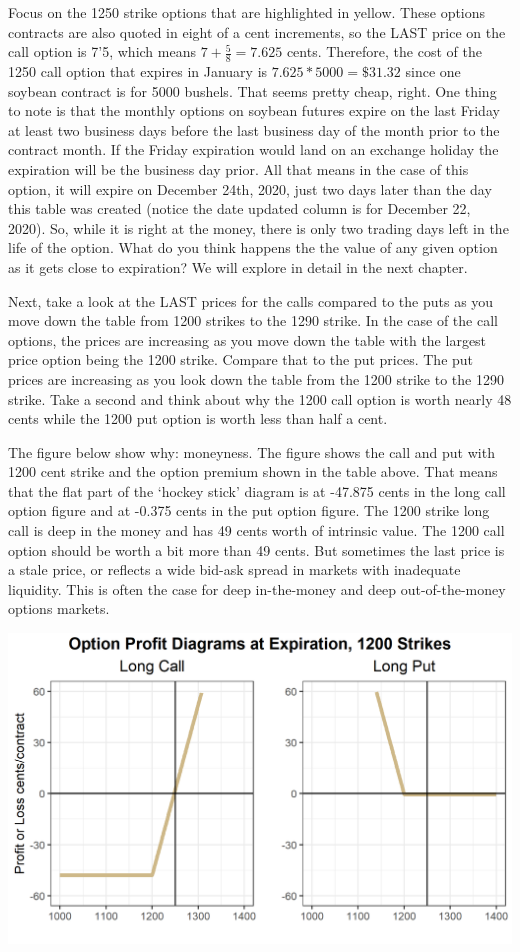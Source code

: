 \documentclass[
  letterpaper,
  DIV=11,
  numbers=noendperiod]{scrreprt}
\begin{document}
Focus on the 1250 strike options that are highlighted in yellow. These
options contracts are also quoted in eight of a cent increments, so the
LAST price on the call option is 7'5, which means
\(7 + \frac{5}{8} = 7.625\) cents. Therefore, the cost of the 1250 call
option that expires in January is \(7.625*5000 = \$31.32\) since one
soybean contract is for 5000 bushels. That seems pretty cheap, right.
One thing to note is that the monthly options on soybean futures expire
on the last Friday at least two business days before the last business
day of the month prior to the contract month. If the Friday expiration
would land on an exchange holiday the expiration will be the business
day prior. All that means in the case of this option, it will expire on
December 24th, 2020, just two days later than the day this table was
created (notice the date updated column is for December 22, 2020). So,
while it is right at the money, there is only two trading days left in
the life of the option. What do you think happens the the value of any
given option as it gets close to expiration? We will explore in detail
in the next chapter.

Next, take a look at the LAST prices for the calls compared to the puts
as you move down the table from 1200 strikes to the 1290 strike. In the
case of the call options, the prices are increasing as you move down the
table with the largest price option being the 1200 strike. Compare that
to the put prices. The put prices are increasing as you look down the
table from the 1200 strike to the 1290 strike. Take a second and think
about why the 1200 call option is worth nearly 48 cents while the 1200
put option is worth less than half a cent.

The figure below show why: moneyness. The figure shows the call and put
with 1200 cent strike and the option premium shown in the table above.
That means that the flat part of the `hockey stick' diagram is at
-47.875 cents in the long call option figure and at -0.375 cents in the
put option figure. The 1200 strike long call is deep in the money and
has 49 cents worth of intrinsic value. The 1200 call option should be
worth a bit more than 49 cents. But sometimes the last price is a stale
price, or reflects a wide bid-ask spread in markets with inadequate
liquidity. This is often the case for deep in-the-money and deep
out-of-the-money options markets.

\includegraphics{assets/Options1-optionmoneynessplot.png}
\end{document}

